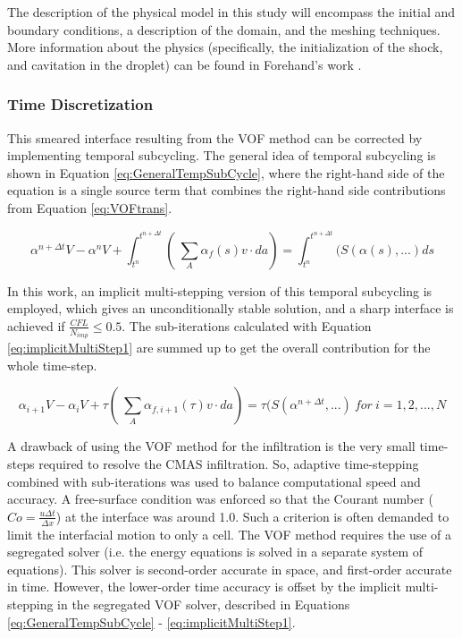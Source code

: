 \documentclass{UCF_ETD}
\begin{document}
The description of the physical model  in this study will encompass the initial and boundary conditions, a description of the domain, and the meshing techniques. More information about the physics (specifically, the initialization of the shock, and cavitation in the droplet) can be found in Forehand's work \cite{Forehand2024}.

\subsubsection{Time Discretization}
\label{sec:metthods_time}

This smeared interface resulting from the VOF method can be corrected by implementing temporal subcycling. The general idea of temporal subcycling is shown in Equation \ref{eq:GeneralTempSubCycle}, where the right-hand side of the equation is a single source term that combines the right-hand side contributions from Equation \ref{eq:VOFtrans}. 

\begin{equation}
\label{eq:GeneralTempSubCycle}
    \alpha^{n+\Delta t}V - \alpha^{n}V + \int_{t^{n}}^{t^{n+\Delta t}}( \ \sum_{A}\alpha_{f}(s) v \cdot da) = \int_{t^{n}}^{t^{n+\Delta t}}(S(\alpha (s),...)ds
\end{equation}

In this work, an implicit multi-stepping version of this temporal subcycling is employed, which gives an unconditionally stable solution, and a sharp interface is achieved if $\frac{CFL}{N_{imp}} \leq 0.5 $. The sub-iterations calculated with Equation \ref{eq:implicitMultiStep1} are summed up to get the overall contribution for the whole time-step.

\begin{equation}
\label{eq:implicitMultiStep1}
    \alpha_{i+1}V - \alpha_{i}V + \tau( \ \sum_{A}\alpha_{f,i+1}(\tau) v \cdot da) = \tau(S(\alpha^{n+\Delta t},...) ~for~ i = 1, 2, ..., N
\end{equation}

A drawback of using the VOF method for the infiltration is the very small time-steps required to resolve the CMAS infiltration. So, adaptive time-stepping combined with sub-iterations was used to balance computational speed and accuracy. A free-surface condition was enforced so that the Courant number ($Co = \frac{u \Delta t}{\Delta x}$) at the interface was around 1.0. Such a criterion is often demanded to limit the interfacial motion to only a cell. The VOF method requires the use of a segregated solver (i.e. the energy equations is solved in a separate system of equations). This solver is second-order accurate in space, and first-order accurate in time. However, the lower-order time accuracy is offset by the implicit multi-stepping in the segregated VOF solver, described in Equations \ref{eq:GeneralTempSubCycle} - \ref{eq:implicitMultiStep1}. 
\end{document}
